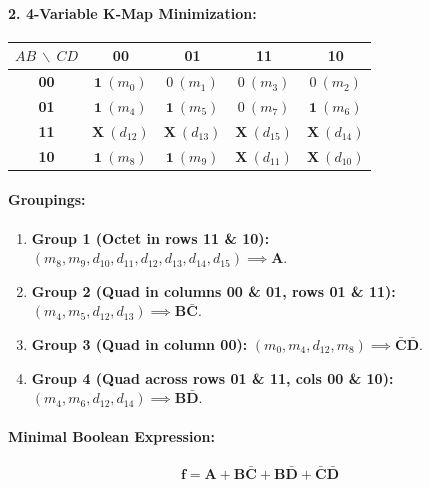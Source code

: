 \documentclass[11pt,a4paper,oneside]{book}
\begin{document}
\paragraph{2. 4-Variable K-Map Minimization:}
\begin{center}
\begin{tabular}{|c|c|c|c|c|}
\hline
$AB \ \backslash \ CD$ & \textbf{00} & \textbf{01} & \textbf{11} & \textbf{10} \\ \hline
\textbf{00} & $\mathbf{1}\ (m_0)$ & $0\ (m_1)$ & $0\ (m_3)$ & $0\ (m_2)$ \\ \hline
\textbf{01} & $\mathbf{1}\ (m_4)$ & $\mathbf{1}\ (m_5)$ & $0\ (m_7)$ & $\mathbf{1}\ (m_6)$ \\ \hline
\textbf{11} & $\mathbf{X}\ (d_{12})$ & $\mathbf{X}\ (d_{13})$ & $\mathbf{X}\ (d_{15})$ & $\mathbf{X}\ (d_{14})$ \\ \hline
\textbf{10} & $\mathbf{1}\ (m_8)$ & $\mathbf{1}\ (m_9)$ & $\mathbf{X}\ (d_{11})$ & $\mathbf{X}\ (d_{10})$ \\ \hline
\end{tabular}
\end{center}

\paragraph{Groupings:}
\begin{enumerate}
  \item \textbf{Group 1 (Octet in rows 11 \& 10):} $(m_8, m_9, d_{10}, d_{11}, d_{12}, d_{13}, d_{14}, d_{15}) \implies \mathbf{A}$.
  \item \textbf{Group 2 (Quad in columns 00 \& 01, rows 01 \& 11):} $(m_4, m_5, d_{12}, d_{13}) \implies \mathbf{B\bar{C}}$.
  \item \textbf{Group 3 (Quad in column 00):} $(m_0, m_4, d_{12}, m_8) \implies \mathbf{\bar{C}\bar{D}}$.
  \item \textbf{Group 4 (Quad across rows 01 \& 11, cols 00 \& 10):} $(m_4, m_6, d_{12}, d_{14}) \implies \mathbf{B\bar{D}}$.
\end{enumerate}

\paragraph{Minimal Boolean Expression:}
\[
\mathbf{f = A + B\bar{C} + B\bar{D} + \bar{C}\bar{D}}
\]
\end{document}
